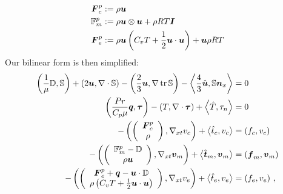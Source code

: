 \documentclass{article}
\begin{document}
\begin{align*}
\bfF^p_c&:=\rho\bfu\\
\mathbb{F}^p_m&:=\rho\bfu\otimes\bfu+\rho RT\bfI\\
\bfF^p_e&:=\rho\bfu\LRp{C_v T+\frac{1}{2}\bfu\cdot\bfu}+\bfu\rho RT
\end{align*}
Our bilinear form is then simplified:
\begin{subequations}
\label{eq:primitiveBF}
\begin{align}
	\LRp{\frac{1}{\mu}\mathbb{D},\mathbb{S}}+\LRp{2\bfu,\Div\mathbb{S}}-\LRp{\frac{2}{3}\bfu,\Grad\trace{\mathbb{S}}}
	-\LRa{\frac{4}{3}\hat\bfu,\mathbb{S}\bfn_x}&=0\\
	\LRp{\frac{Pr}{C_p\mu}\bfq,\bftau}-\LRp{T,\Div\bftau}+\LRa{\hat T,\tau_n}&=0\\
	-\LRp{\vecttwo{\bfF^p_c}{\rho},\Gradxt v_c}+\LRa{\hat t_c,v_c}&=\LRp{f_c,v_c}\\
	-\LRp{\vecttwo{\mathbb{F}^p_m-\mathbb{D}}{\rho\bfu},\Gradxt\bfv_m}+\LRa{\hat\bft_m,\bfv_m}&=\LRp{\bff_m,\bfv_m}\\
	-\LRp{\vecttwo{\bfF^p_e+\bfq-\bfu\cdot\mathbb{D}}{\rho\LRp{C_v T+\frac{1}{2}\bfu\cdot\bfu}},\Gradxt v_e}
	+\LRa{\hat t_e,v_e}&=\LRp{f_e,v_e}\,,
\end{align}
\end{subequations}
\end{document}
